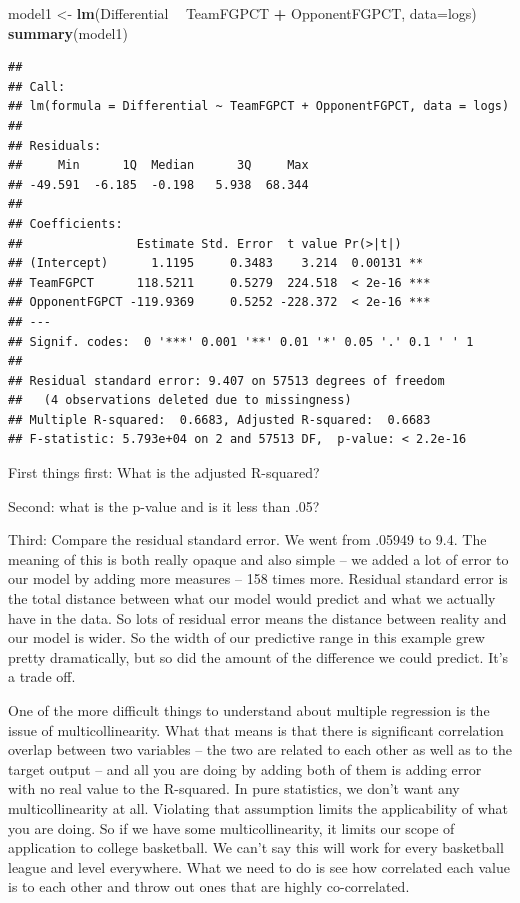 \documentclass[]{book}
\newenvironment{Shaded}{\begin{snugshade}}{\end{snugshade}}
\newcommand{\KeywordTok}[1]{\textcolor[rgb]{0.13,0.29,0.53}{\textbf{#1}}}
\newcommand{\DataTypeTok}[1]{\textcolor[rgb]{0.13,0.29,0.53}{#1}}
\newcommand{\StringTok}[1]{\textcolor[rgb]{0.31,0.60,0.02}{#1}}
\newcommand{\OperatorTok}[1]{\textcolor[rgb]{0.81,0.36,0.00}{\textbf{#1}}}
\newcommand{\NormalTok}[1]{#1}
\begin{document}
\begin{Shaded}
\begin{Highlighting}[]
\NormalTok{model1 <-}\StringTok{ }\KeywordTok{lm}\NormalTok{(Differential }\OperatorTok{~}\StringTok{ }\NormalTok{TeamFGPCT }\OperatorTok{+}\StringTok{ }\NormalTok{OpponentFGPCT, }\DataTypeTok{data=}\NormalTok{logs)}
\KeywordTok{summary}\NormalTok{(model1)}
\end{Highlighting}
\end{Shaded}

\begin{verbatim}
## 
## Call:
## lm(formula = Differential ~ TeamFGPCT + OpponentFGPCT, data = logs)
## 
## Residuals:
##     Min      1Q  Median      3Q     Max 
## -49.591  -6.185  -0.198   5.938  68.344 
## 
## Coefficients:
##                Estimate Std. Error  t value Pr(>|t|)    
## (Intercept)      1.1195     0.3483    3.214  0.00131 ** 
## TeamFGPCT      118.5211     0.5279  224.518  < 2e-16 ***
## OpponentFGPCT -119.9369     0.5252 -228.372  < 2e-16 ***
## ---
## Signif. codes:  0 '***' 0.001 '**' 0.01 '*' 0.05 '.' 0.1 ' ' 1
## 
## Residual standard error: 9.407 on 57513 degrees of freedom
##   (4 observations deleted due to missingness)
## Multiple R-squared:  0.6683, Adjusted R-squared:  0.6683 
## F-statistic: 5.793e+04 on 2 and 57513 DF,  p-value: < 2.2e-16
\end{verbatim}

First things first: What is the adjusted R-squared?

Second: what is the p-value and is it less than .05?

Third: Compare the residual standard error. We went from .05949 to 9.4.
The meaning of this is both really opaque and also simple -- we added a
lot of error to our model by adding more measures -- 158 times more.
Residual standard error is the total distance between what our model
would predict and what we actually have in the data. So lots of residual
error means the distance between reality and our model is wider. So the
width of our predictive range in this example grew pretty dramatically,
but so did the amount of the difference we could predict. It's a trade
off.

One of the more difficult things to understand about multiple regression
is the issue of multicollinearity. What that means is that there is
significant correlation overlap between two variables -- the two are
related to each other as well as to the target output -- and all you are
doing by adding both of them is adding error with no real value to the
R-squared. In pure statistics, we don't want any multicollinearity at
all. Violating that assumption limits the applicability of what you are
doing. So if we have some multicollinearity, it limits our scope of
application to college basketball. We can't say this will work for every
basketball league and level everywhere. What we need to do is see how
correlated each value is to each other and throw out ones that are
highly co-correlated.
\end{document}
